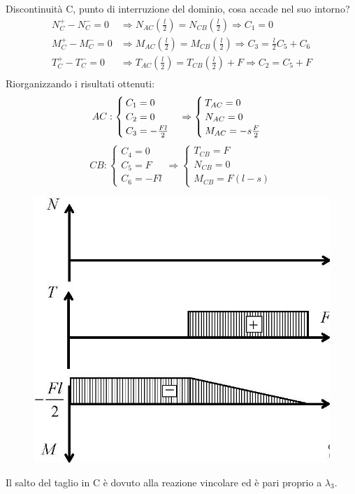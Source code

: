 \documentclass{article}
\begin{document}
\begin{adjustwidth}{2in}{}
	Discontinuità C, punto di interruzione del dominio, cosa accade nel suo intorno?
	\[
	\begin{split}
		N^+_C - N^-_C = 0 & \Rightarrow N_{AC} \left( \frac{l}{2}\right)  = N_{CB} \left( \frac{l}{2}\right)  \Rightarrow  C_1 = 0 \\
		M^+_C - M^-_C = 0 & \Rightarrow M_{AC} \left( \frac{l}{2}\right)  = M_{CB} \left( \frac{l}{2}\right)  \Rightarrow  C_3 = \frac{l}{2}C_5 + C_6 \\
		T^+_C - T^-_C = 0 & \Rightarrow T_{AC} \left( \frac{l}{2}\right)  = T_{CB} \left( \frac{l}{2}\right)  + F \Rightarrow  C_2 = C_5 + F \\
	\end{split}
	\]
		Riorganizzando i risultati ottenuti:
	\[
	AC: 	\begin{cases}
		C_1 = 0 \\
		C_2 = 0 \\
		C_3 = -{Fl\over2}
	\end{cases} \Rightarrow \begin{cases}
		T_{AC} = 0 \\
		
		N_{AC} = 0 \\
		
		M_{AC} =  -s\frac{F}{2}
	\end{cases}
	\] \hspace{0.5cm}
	\[
	CB: 	\begin{cases}
		C_4 = 0 \\
		C_5 = F \\
		C_6 = -Fl
	\end{cases} \Rightarrow \begin{cases}
		T_{CB} = F \\
		
		N_{CB} = 0 \\
		
		M_{CB} =  F(l-s)
	\end{cases}
	\]
	\begin{figure}[H]
		\centering
		\includegraphics[width=0.3\linewidth]{"immagini/1.PARTE5_Pagina_22"}
	\end{figure}
	Il salto del taglio in C è dovuto alla reazione vincolare ed è pari proprio a $\lambda_3$.\newline 
	

\end{adjustwidth}
\end{document}
